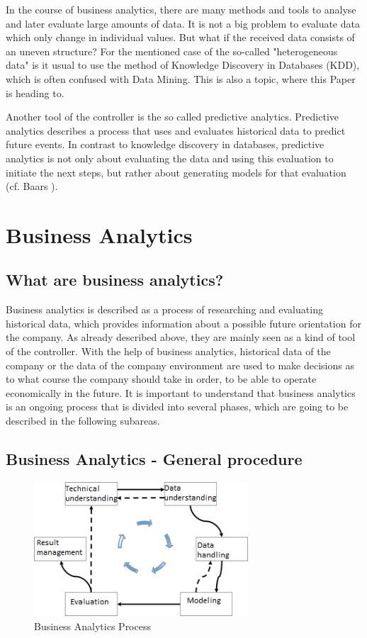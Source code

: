 \documentclass[12pt,twocolumn,twoside]{conference}   %
\begin{document}
In the course of business analytics, there are many methods and tools to analyse and later evaluate large amounts of data. It is not a big problem to evaluate data which only change in individual values. But what if the received data consists of an uneven structure? For the mentioned case of the so-called "heterogeneous data" is it usual to use the method of Knowledge Discovery in Databases (KDD), which is often confused with Data Mining. This is also a topic, where this Paper is heading to.

Another tool of the controller is the so called predictive analytics. Predictive analytics describes a process that uses and evaluates historical data to predict future events. In contrast to knowledge discovery in databases, predictive analytics is not only about evaluating the data and using this evaluation to initiate the next steps, but rather about generating models for that evaluation (cf. Baars \cite{1}). 




\section{Business Analytics}
\subsection{What are business analytics?}
Business analytics is described as a process of researching and evaluating historical data, which provides information about a possible future orientation for the company. As already described above, they are mainly seen as a kind of tool of the controller. With the help of business analytics, historical data of the company or the data of the company environment are used to make decisions as to what course the company should take in order, to be able to operate economically in the future. It is important to understand that business analytics is an ongoing process that is divided into several phases, which are going to be described in the following subareas.

\subsection{Business Analytics - General procedure}
\begin{figure}[H]
\centering
\includegraphics[width=8cm]{Abbildungen/Business_Analytics_Process.png}
\caption{Business Analytics Process \cite{10}}\label{visina8}
\end{figure}
\end{document}
